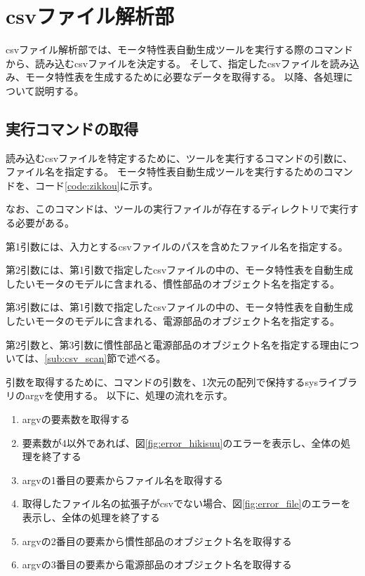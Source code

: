 \section{csvファイル解析部}\label{csv_sec}
csvファイル解析部では、モータ特性表自動生成ツールを実行する際のコマンドから、読み込むcsvファイルを決定する。
そして、指定したcsvファイルを読み込み、モータ特性表を生成するために必要なデータを取得する。
以降、各処理について説明する。
\subsection{実行コマンドの取得}\label{sub:comand_get}
読み込むcsvファイルを特定するために、ツールを実行するコマンドの引数に、ファイル名を指定する。
モータ特性表自動生成ツールを実行するためのコマンドを、コード\ref{code:zikkou}に示す。
\begin{figure}[t]
	
\end{figure}
なお、このコマンドは、ツールの実行ファイルが存在するディレクトリで実行する必要がある。

第1引数には、入力とするcsvファイルのパスを含めたファイル名を指定する。

第2引数には、第1引数で指定したcsvファイルの中の、モータ特性表を自動生成したいモータのモデルに含まれる、慣性部品のオブジェクト名を指定する。

第3引数には、第1引数で指定したcsvファイルの中の、モータ特性表を自動生成したいモータのモデルに含まれる、電源部品のオブジェクト名を指定する。

第2引数と、第3引数に慣性部品と電源部品のオブジェクト名を指定する理由については、\ref{sub:csv_scan}節で述べる。

引数を取得するために、コマンドの引数を、1次元の配列で保持するsysライブラリのargvを使用する。
以下に、処理の流れを示す。

\begin{enumerate}
    \item argvの要素数を取得する
    \item 要素数が4以外であれば、図\ref{fig:error_hikisuu}のエラーを表示し、全体の処理を終了する
    \item argvの1番目の要素からファイル名を取得する
    \item 取得したファイル名の拡張子がcsvでない場合、図\ref{fig:error_file}のエラーを表示し、全体の処理を終了する
    \item argvの2番目の要素から慣性部品のオブジェクト名を取得する
    \item argvの3番目の要素から電源部品のオブジェクト名を取得する
\end{enumerate}

